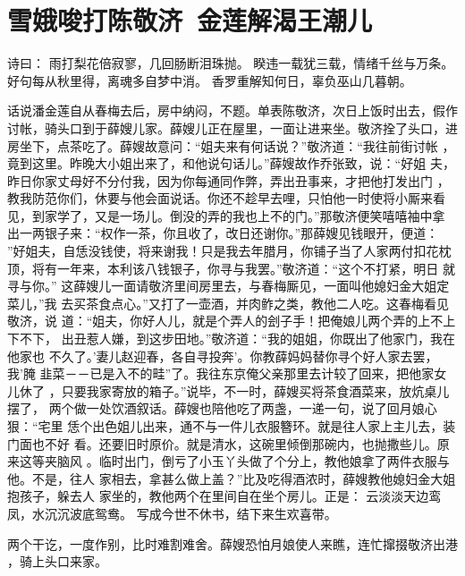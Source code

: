 \chapter{雪娥唆打陈敬济~金莲解渴王潮儿}

诗曰：
雨打梨花倍寂寥，几回肠断泪珠抛。
睽违一载犹三载，情绪千丝与万条。
好句每从秋里得，离魂多自梦中消。
香罗重解知何日，辜负巫山几暮朝。

话说潘金莲自从春梅去后，房中纳闷，不题。单表陈敬济，次日上饭时出去，假作
讨帐，骑头口到于薛嫂儿家。薛嫂儿正在屋里，一面让进来坐。敬济拴了头口，进
房坐下，点茶吃了。薛嫂故意问：“姐夫来有何话说？”敬济道：“我往前街讨帐
，竟到这里。昨晚大小姐出来了，和他说句话儿。”薛嫂故作乔张致，说：“好姐
夫，昨日你家丈母好不分付我，因为你每通同作弊，弄出丑事来，才把他打发出门
，教我防范你们，休要与他会面说话。你还不趁早去哩，只怕他一时使将小厮来看
见，到家学了，又是一场儿。倒没的弄的我也上不的门。”那敬济便笑嘻嘻袖中拿
出一两银子来：“权作一茶，你且收了，改日还谢你。”那薛嫂见钱眼开，便道：
”好姐夫，自恁没钱使，将来谢我！只是我去年腊月，你铺子当了人家两付扣花枕
顶，将有一年来，本利该八钱银子，你寻与我罢。”敬济道：“这个不打紧，明日
就寻与你。”
这薛嫂儿一面请敬济里间房里去，与春梅厮见，一面叫他媳妇金大姐定菜儿，”我
去买茶食点心。”又打了一壶酒，并肉鲊之类，教他二人吃。这春梅看见敬济，说
道：“姐夫，你好人儿，就是个弄人的刽子手！把俺娘儿两个弄的上不上下不下，
出丑惹人嫌，到这步田地。”敬济道：“我的姐姐，你既出了他家门，我在他家也
不久了。'妻儿赵迎春，各自寻投奔'。你教薛妈妈替你寻个好人家去罢，我'腌
韭菜－－已是入不的畦”了。我往东京俺父亲那里去计较了回来，把他家女儿休了
，只要我家寄放的箱子。”说毕，不一时，薛嫂买将茶食酒菜来，放炕桌儿摆了，
两个做一处饮酒叙话。薛嫂也陪他吃了两盏，一递一句，说了回月娘心狠：“宅里
恁个出色姐儿出来，通不与一件儿衣服簪环。就是往人家上主儿去，装门面也不好
看。还要旧时原价。就是清水，这碗里倾倒那碗内，也抛撒些儿。原来这等夹脑风
。临时出门，倒亏了小玉丫头做了个分上，教他娘拿了两件衣服与他。不是，往人
家相去，拿甚么做上盖？”比及吃得酒浓时，薛嫂教他媳妇金大姐抱孩子，躲去人
家坐的，教他两个在里间自在坐个房儿。正是：
云淡淡天边鸾凤，水沉沉波底鸳鸯。
写成今世不休书，结下来生欢喜带。

两个干讫，一度作别，比时难割难舍。薛嫂恐怕月娘使人来瞧，连忙撺掇敬济出港
，骑上头口来家。

